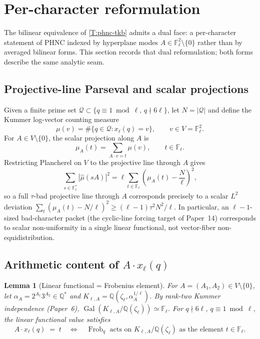 \documentclass[11pt]{article}
\newtheorem{lemma}{Lemma}
\newcommand{\Q}{\mathbb Q}
\newcommand{\F}{\mathbb F}
\newcommand{\1}{\mathbf 1}
\begin{document}
\section{Per-character reformulation}\label{S:per-character}

The bilinear equivalence of \cref{T:phnc-tkb} admits a dual face: a per-character statement of PHNC indexed by hyperplane modes \(A\in\F_\ell^2\setminus\{0\}\) rather than by averaged bilinear forms.  This section records that dual reformulation; both forms describe the same analytic seam.

\subsection{Projective-line Parseval and scalar projections}

Given a finite prime set \(\mathcal Q\subset\{q\equiv 1\bmod\ell,\,q\nmid 6\ell\}\), let \(N=|\mathcal Q|\) and define the Kummer log-vector counting measure
\[
\mu(v)=\#\{q\in\mathcal Q:x_\ell(q)=v\},\qquad v\in V=\F_\ell^2.
\]
For \(A\in V\setminus\{0\}\), the scalar projection along \(A\) is
\[
\mu_A(t)=\sum_{A\cdot v=t}\mu(v),\qquad t\in\F_\ell.
\]
Restricting Plancherel on \(V\) to the projective line through \(A\) gives
\[
\sum_{s\in\F_\ell^*}|\widehat\mu(sA)|^2=\ell\sum_{t\in\F_\ell}\!\left(\mu_A(t)-\frac N\ell\right)^{\!2},
\]
so a full \(\tau\)-bad projective line through \(A\) corresponds precisely to a scalar \(L^2\) deviation \(\sum_t(\mu_A(t)-N/\ell)^2\ge(\ell-1)\tau^2N^2/\ell\).  In particular, an \(\ell-1\)-sized bad-character packet (the cyclic-line forcing target of Paper~14) corresponds to scalar non-uniformity in a single linear functional, not vector-fiber non-equidistribution.

\subsection{Arithmetic content of \texorpdfstring{$A\cdot x_\ell(q)$}{A.x\_l(q)}}

\begin{lemma}[Linear functional = Frobenius element]\label{L:arithmetic-A}
For \(A=(A_1,A_2)\in V\setminus\{0\}\), let \(\alpha_A=2^{A_1}3^{A_2}\in\Q^*\) and \(K_{\ell,A}=\Q(\zeta_\ell,\alpha_A^{1/\ell})\).  By rank-two Kummer independence (Paper~6), \(\operatorname{Gal}(K_{\ell,A}/\Q(\zeta_\ell))\simeq\F_\ell\).  For \(q\nmid 6\ell\), \(q\equiv 1\bmod\ell\), the linear functional value satisfies
\[
A\cdot x_\ell(q)\;=\;t\quad\Longleftrightarrow\quad\operatorname{Frob}_q\text{ acts on }K_{\ell,A}/\Q(\zeta_\ell)\text{ as the element }t\in\F_\ell.
\]
\end{lemma}
\end{document}
